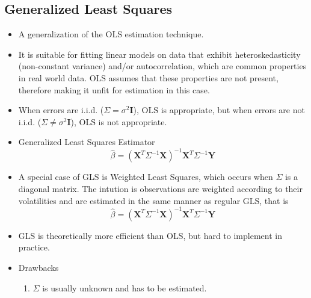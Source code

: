 \documentclass[11pt]{article}
\begin{document}
\subsection{Generalized Least Squares}
\begin{itemize}
    \item A generalization of the OLS estimation technique. 
    \item It is suitable for fitting linear models on data that exhibit heteroskedasticity 
    (non-constant variance) and/or autocorrelation, which are common properties in real world 
    data. OLS assumes that these properties are not present, therefore making it unfit for 
    estimation in this case. 
    \item When errors are i.i.d. ($\Sigma = \sigma^2 \boldsymbol{I}$), OLS is appropriate, but
    when errors are not i.i.d. ($\Sigma \ne \sigma^2 \boldsymbol{I}$), OLS is not appropriate.
    \item Generalized Least Squares Estimator
    \[\hat{\beta} = {(\boldsymbol{X}^T \Sigma^{-1} \boldsymbol{X})}^{-1} \boldsymbol{X}^T 
    \Sigma^{-1} \boldsymbol{Y}\]
    \item A special case of GLS is Weighted Least Squares, which occurs when $\Sigma$ is a 
    diagonal matrix. The intution is observations are weighted according to their volatilities
    and are estimated in the same manner as regular GLS, that is 
    \[\hat{\beta} = {(\boldsymbol{X}^T \Sigma^{-1} \boldsymbol{X})}^{-1} \boldsymbol{X}^T 
    \Sigma^{-1} \boldsymbol{Y}\]
    \item GLS is theoretically more efficient than OLS, but hard to implement in practice. 
    \item Drawbacks
    \begin{enumerate}
        \item $\Sigma$ is usually unknown and has to be estimated.
    \end{enumerate}
\end{itemize}
\end{document}

